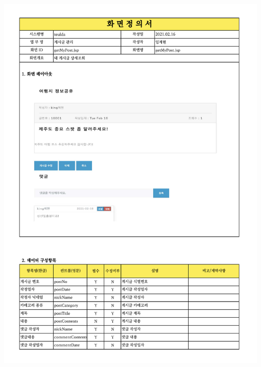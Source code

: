 {{{{{{{{{{{{{{{{{{{{{{{{{{{{{{{{{{{{{{{{{{{{{{{{{{{{{{{{{{{{{{{{{\includegraphics[width=19cm]{./Figure/Design/Display/post/post_13.pdf} \\
}}}}}}}}}}}}}}}}}}}}}}}}}}}}}}}}}}}}}}}}}}}}}}}}}}}}}}}}}}}}}}}}}
